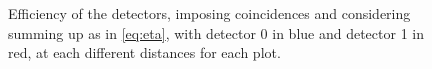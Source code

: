 \begin{figure}[H]
\begin{minipage}[c]{0.35\linewidth}
	 \label{fig:coinc_20} 
	\end{minipage}
	\caption{Efficiency of the detectors, imposing coincidences and considering summing up as in \ref{eq:eta}, with detector 0 in blue and detector 1 in red, at each different distances for each plot.}
    \label{fig:eff_coinc3}
	\end{figure}


